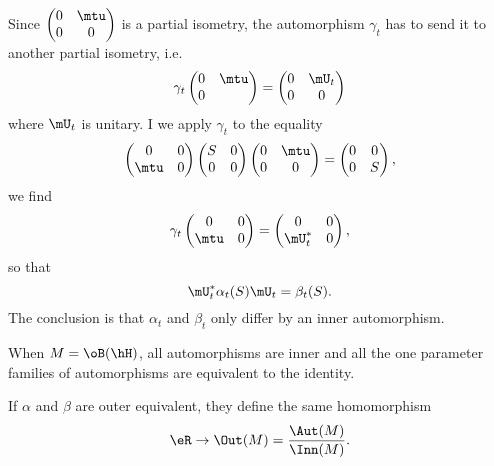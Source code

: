 Since $
\begin{pmatrix}
  0	&	\mtu	\\ 
  0	&	0	
\end{pmatrix}
$ is a partial isometry, the automorphism $\gamma_t$ has to send it to another partial isometry, i.e.
\begin{equation}
		\gamma_t
	\begin{pmatrix}
	  0	&	\mtu	\\ 
	  0	&		
	\end{pmatrix}
	=
	\begin{pmatrix}
	  0	&	\mU_t	\\ 
	  0	&	0	
	\end{pmatrix}
\end{equation}
where $\mU_t$ is unitary. I we apply $\gamma_t$ to the equality
\begin{equation}
	\begin{pmatrix}
	  0	&	0	\\ 
	  \mtu	&	0	
	\end{pmatrix}
	\begin{pmatrix}
	  S	&	0	\\ 
	  0	&	0	
	\end{pmatrix}
	\begin{pmatrix}
	  0	&	\mtu	\\ 
	  0	&	0	
	\end{pmatrix}
	=
	\begin{pmatrix}
	  0	&	0	\\ 
	  0	&	S	
	\end{pmatrix},
\end{equation}
we find
\begin{equation}
	\gamma_t
	\begin{pmatrix}
		0	&	0	\\ 
		\mtu	&	0	
	\end{pmatrix}
	=
	\begin{pmatrix}
		0	&	0	\\ 
		\mU_t^*	&	0	
	\end{pmatrix},
\end{equation}
so that
\begin{equation}
	\mU_t^*\alpha_t(S)\mU_t=\beta_t(S).
\end{equation}
The conclusion is that $\alpha_t$ and $\beta_t$ only differ by an inner automorphism.

When $M=\oB(\hH)$, all automorphisms are inner and all the one parameter families of automorphisms are equivalent to the identity.

If $\alpha$ and $\beta$ are outer equivalent, they define the same homomorphism
\begin{equation}
	\eR\to\Out(M)=\frac{ \Aut(M) }{ \Inn(M) }.
\end{equation}

